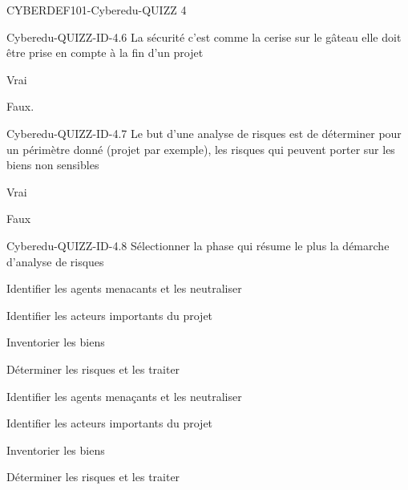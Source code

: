 \documentclass[12pt]{article}
\begin{document}
\begin{quiz}{CYBERDEF101-Cyberedu-QUIZZ 4}
\begin{multi}[multiple=true]{Cyberedu-QUIZZ-ID-4.6}
La s\'ecurit\'e c'est comme la cerise sur le g\^ateau  elle doit \^etre prise en compte \`a la fin d'un projet
\item	Vrai 
\item*	Faux.
\end{multi}
\begin{multi}[multiple=true]{Cyberedu-QUIZZ-ID-4.7}
Le but d'une analyse de risques est de d\'eterminer pour un p\'erim\`etre donn\'e (projet par exemple), les risques qui peuvent porter sur les biens non sensibles 
\item	Vrai 
\item*	Faux
\end{multi}

\begin{multi}[multiple=true]{Cyberedu-QUIZZ-ID-4.8}
S\'electionner la phase qui r\'esume le plus la d\'emarche d'analyse de risques
\item Identifier les agents menacants et les neutraliser 
\item Identifier les acteurs importants du projet 
\item Inventorier les biens
\item* D\'eterminer les risques et les traiter
\end{multi}

\item Identifier les agents mena\c{c}ants et les neutraliser 
\item Identifier les acteurs importants du projet 
\item Inventorier les biens
\item* D\'eterminer les risques et les traiter


\end{quiz}
\end{document}
